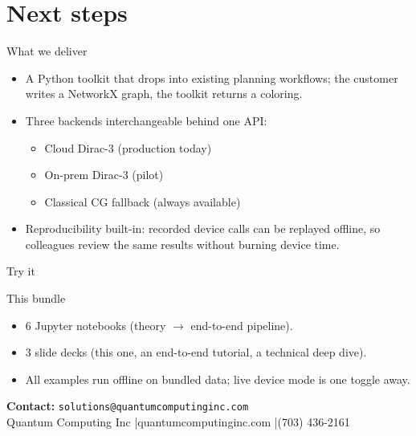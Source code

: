 \documentclass[aspectratio=169,11pt]{beamer}
\begin{document}
\section{Next steps}

\begin{frame}{What we deliver}
  \begin{itemize}
    \item A \alert{Python toolkit} that drops into existing planning
          workflows; the customer writes a NetworkX graph, the toolkit
          returns a coloring.
    \item \alert{Three backends} interchangeable behind one API:
      \begin{itemize}\small
        \item Cloud Dirac-3 (production today)
        \item On-prem Dirac-3 (pilot)
        \item Classical CG fallback (always available)
      \end{itemize}
    \item \alert{Reproducibility built-in}: recorded device calls can be
          replayed offline, so colleagues review the same results without
          burning device time.
  \end{itemize}
\end{frame}

\begin{frame}{Try it}
  \begin{block}{This bundle}
    \begin{itemize}
      \item 6 Jupyter notebooks (theory $\to$ end-to-end pipeline).
      \item 3 slide decks (this one, an end-to-end tutorial, a technical
            deep dive).
      \item All examples run \alert{offline} on bundled data; live device
            mode is one toggle away.
    \end{itemize}
  \end{block}

  \medskip
  \begin{center}
    \large\color{QCIcol1}
    \textbf{Contact:} \texttt{solutions@quantumcomputinginc.com}\\
    \medskip
    \footnotesize\color{QCIcol2}
    Quantum Computing Inc \quad|\quad quantumcomputinginc.com \quad|\quad (703) 436-2161
  \end{center}
\end{frame}
\end{document}
